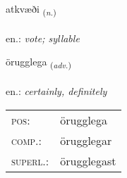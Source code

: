 \documentclass[frontgrid, backgrid]{flacards}\usepackage[]{graphicx}\usepackage[]{xcolor}
\begin{document}
\renewcommand{\flhead}{\vskip5pt \fboxsep=0pt {\small\bfseries\footnotesize Nafnorð | Noun}}
\renewcommand{\fcfoot}{\vskip5pt \fboxsep=0pt \hspace{2pt}{\small\bfseries\footnotesize 2K}}

\renewcommand{\blhead}{\vskip5pt {\small\bfseries\footnotesize Nafnorð | Noun }}
\renewcommand{\bcfoot}{\vskip5pt \hspace{2pt}{\small\bfseries\footnotesize 2K}}


{atkvæði \small{\textsubscript{(\textit{n.})}} \\[1ex] %
\textphonetic{[aːtkʰvaiðɪ]} \\
en.: \emph{vote; syllable} \\  [2ex]
\renewcommand*{\arraystretch}{0.8}
}

\renewcommand{\flhead}{\vskip5pt \fboxsep=0pt {\small\bfseries\footnotesize Atviksorð | Adverb}}
\renewcommand{\fcfoot}{\vskip5pt \fboxsep=0pt \hspace{2pt}{\small\bfseries\footnotesize 2K}}

\renewcommand{\blhead}{\vskip5pt {\small\bfseries\footnotesize Atviksorð | Adverb }}
\renewcommand{\bcfoot}{\vskip5pt \hspace{2pt}{\small\bfseries\footnotesize 2K}}


{örugglega \small{\textsubscript{(\textit{adv.})}} \\[1ex] %
\textphonetic{[œːrʏklɛɣa]} \\
en.: \emph{certainly, definitely} \\  [2ex]
\renewcommand*{\arraystretch}{0.8}
\begin{tabular}{ll}
\textsc{pos}: & örugglega \\ 
\textsc{comp.}: & örugglegar \\ 
\textsc{superl.}: & örugglegast \\
\end{tabular}
}
\end{document}

